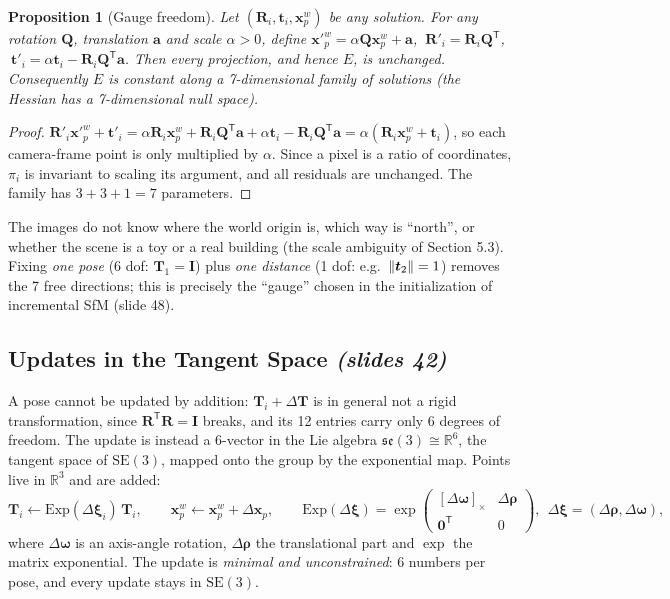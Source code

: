 \documentclass[11pt,a4paper]{article}
\newcommand{\slr}[1]{\texorpdfstring{\emph{(slides #1)}}{(slides #1)}}
\newcommand{\R}{\mathbb{R}}
\newcommand{\SE}{\mathrm{SE}(3)}
\newcommand{\se}{\mathfrak{se}(3)}
\newcommand{\sk}[1]{[#1]_{\times}}
\newcommand{\tr}{^{\mathsf T}}
\theoremstyle{definition}
\theoremstyle{plain}
\newtheorem{proposition}[definition]{Proposition}
\theoremstyle{remark}
\begin{document}
\begin{proposition}[Gauge freedom]\label{prop:gauge}
Let $(\bm R_i,\bm t_i,\bm x^w_p)$ be any solution. For any rotation $\bm Q$, translation $\bm a$ and scale $\alpha>0$, define
$\bm x'^w_p=\alpha\bm Q\bm x^w_p+\bm a$, $\ \bm R'_i=\bm R_i\bm Q\tr$, $\ \bm t'_i=\alpha\bm t_i-\bm R_i\bm Q\tr\bm a$.
Then every projection, and hence $E$, is unchanged. Consequently $E$ is constant along a 7-dimensional family of solutions (the Hessian has a 7-dimensional null space).
\end{proposition}
\begin{proof}
$\bm R'_i\bm x'^w_p+\bm t'_i=\alpha\bm R_i\bm x^w_p+\bm R_i\bm Q\tr\bm a+\alpha\bm t_i-\bm R_i\bm Q\tr\bm a=\alpha(\bm R_i\bm x^w_p+\bm t_i)$,
so each camera-frame point is only multiplied by $\alpha$. Since a pixel is a ratio of coordinates, $\pi_i$ is invariant to scaling its argument, and all residuals are unchanged. The family has $3+3+1=7$ parameters.
\end{proof}

\begin{intuition}
The images do not know where the world origin is, which way is ``north'', or whether the scene is a toy or a real building (the scale ambiguity of Section 5.3). Fixing \emph{one pose} ($6$ dof: $\bm T_1=\bm I$) plus \emph{one distance} (1 dof: e.g.\ $\lVert \bm t_2\rVert=1$) removes the 7 free directions; this is precisely the ``gauge'' chosen in the initialization of incremental SfM (slide 48).
\end{intuition}

\subsection{Updates in the Tangent Space \slr{42}}
A pose cannot be updated by addition: $\bm T_i+\Delta\bm T$ is in general not a rigid transformation, since $\bm R\tr\bm R=\bm I$ breaks, and its 12 entries carry only 6 degrees of freedom. The update is instead a 6-vector in the Lie algebra $\se\cong\R^6$, the tangent space of $\SE$, mapped onto the group by the exponential map. Points live in $\R^3$ and are added:
\[
\bm T_i\leftarrow\mathrm{Exp}(\Delta\bm\xi_i)\,\bm T_i,\qquad \bm x^w_p\leftarrow\bm x^w_p+\Delta\bm x_p,\qquad
\mathrm{Exp}(\Delta\bm\xi)=\exp\begin{pmatrix}\sk{\Delta\bm\omega}&\Delta\bm\rho\\\bm 0\tr&0\end{pmatrix},\ \ \Delta\bm\xi=(\Delta\bm\rho,\Delta\bm\omega),
\]
where $\Delta\bm\omega$ is an axis-angle rotation, $\Delta\bm\rho$ the translational part and $\exp$ the matrix exponential. The update is \emph{minimal and unconstrained}: 6 numbers per pose, and every update stays in $\SE$.
\end{document}
